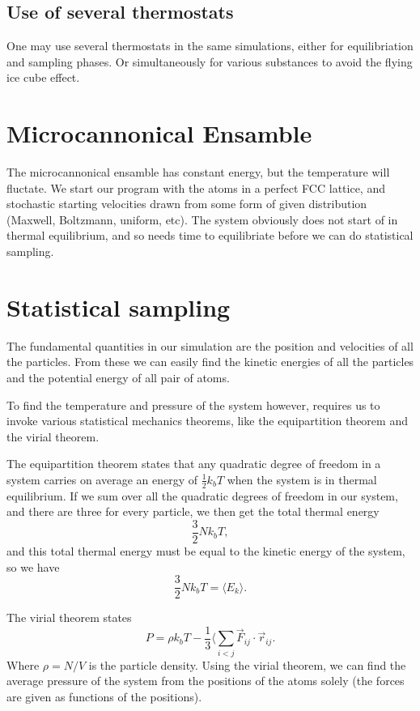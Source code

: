 \documentclass[a4paper, 11pt, notitlepage, english]{article}
\begin{document}
\subsection*{Use of several thermostats}

One may use several thermostats in the same simulations, either for equilibriation and sampling phases. Or simultaneously for various substances to avoid the flying ice cube effect.

\clearpage

\section*{Microcannonical Ensamble}

The microcannonical ensamble has constant energy, but the temperature will fluctate. We start our program with the atoms in a perfect FCC lattice, and stochastic starting velocities drawn from some form of given distribution (Maxwell, Boltzmann, uniform, etc). The system obviously does not start of in thermal equilibrium, and so needs time to equilibriate before we can do statistical sampling.

\section*{Statistical sampling}

The fundamental quantities in our simulation are the position and velocities of all the particles. From these we can easily find the kinetic energies of all the particles and the potential energy of all pair of atoms.

To find the temperature and pressure of the system however, requires us to invoke various statistical mechanics theorems, like the equipartition theorem and the virial theorem.

The equipartition theorem states that any quadratic degree of freedom in a system carries on average an energy of $\frac{1}{2}k_b T$ when the system is in thermal equilibrium. If we sum over all the quadratic degrees of freedom in our system, and there are three for every particle, we then get the total thermal energy $$\frac{3}{2}Nk_b T,$$ and this total thermal energy must be equal to the kinetic energy of the system, so we have 
$$ \frac{3}{2}Nk_b T = \langle E_k \rangle.$$

The virial theorem states
$$P = \rho k_b T - \frac{1}{3}\langle \sum_{i<j} \vec{F}_{ij}\cdot \vec{r}_{ij}.$$
Where $\rho = N/V$ is the particle density. Using the virial theorem, we can find the average pressure of the system from the positions of the atoms solely (the forces are given as functions of the positions).
\end{document}
